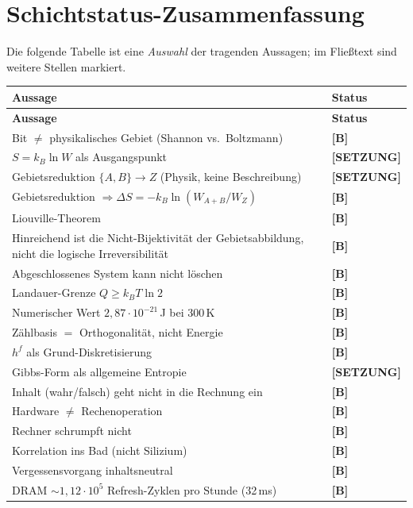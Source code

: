 \section{Schichtstatus-Zusammenfassung}

Die folgende Tabelle ist eine \emph{Auswahl} der tragenden Aussagen; im Fließtext
sind weitere Stellen markiert.

\begin{center}
\small
\begin{longtable}{@{}p{}l@{}}
\toprule
\textbf{Aussage} & \textbf{Status} \\
\midrule
\endfirsthead
\toprule
\textbf{Aussage} & \textbf{Status} \\
\midrule
\endhead
Bit $\ne$ physikalisches Gebiet (Shannon vs.\ Boltzmann) & \textbf{[B]} \\
$S = k_B \ln W$ als Ausgangspunkt & \textbf{[SETZUNG]} \\
Gebietsreduktion $\{A,B\}\to Z$ (Physik, keine Beschreibung) & \textbf{[SETZUNG]} \\
Gebietsreduktion $\Rightarrow \Delta S = -k_B \ln(W_{A+B}/W_Z)$ & \textbf{[B]} \\
Liouville-Theorem & \textbf{[B]} \\
Hinreichend ist die Nicht-Bijektivität der Gebietsabbildung, nicht die logische Irreversibilität & \textbf{[B]} \\
Abgeschlossenes System kann nicht löschen & \textbf{[B]} \\
Landauer-Grenze $Q \ge k_B T \ln 2$ & \textbf{[B]} \\
Numerischer Wert $2{,}87\cdot10^{-21}$\,J bei 300\,K & \textbf{[B]} \\
Zählbasis $=$ Orthogonalität, nicht Energie & \textbf{[B]} \\
$h^f$ als Grund-Diskretisierung & \textbf{[B]} \\
Gibbs-Form als allgemeine Entropie & \textbf{[SETZUNG]} \\
Inhalt (wahr/falsch) geht nicht in die Rechnung ein & \textbf{[B]} \\
Hardware $\ne$ Rechenoperation & \textbf{[B]} \\
Rechner schrumpft nicht & \textbf{[B]} \\
Korrelation ins Bad (nicht Silizium) & \textbf{[B]} \\
Vergessensvorgang inhaltsneutral & \textbf{[B]} \\
DRAM ${\sim}1{,}12\cdot10^{5}$ Refresh-Zyklen pro Stunde (32\,ms) & \textbf{[B]} \\

\end{longtable}
\end{center}
